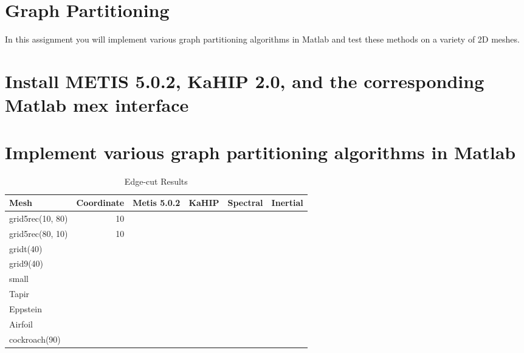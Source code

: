 \documentclass[unicode,11pt,a4paper,oneside,numbers=endperiod,openany]{scrartcl}
\begin{document}
\setassignment
{}

\newline

\section*{Graph Partitioning}
In this assignment  you will implement various graph partitioning algorithms in Matlab and test these methods on a variety of 2D meshes.



\section{Install METIS 5.0.2, KaHIP  2.0, and the corresponding Matlab mex interface }
\section{Implement various graph partitioning algorithms in Matlab }
\begin{table}[h]
	\caption{Edge-cut Results}
	\centering
	\begin{tabular}{l|r|r|r|r|r} \hline\hline 
		Mesh             &  Coordinate           & Metis 5.0.2 &  KaHIP & Spectral & Inertial  \\ \hline
		grid5rec(10, 80) &    10                   &            &            &          &           \\             
		grid5rec(80, 10) &    10                  &            &           &          &           \\ 
		gridt(40)        &                        &            &           &          &           \\ 
		grid9(40)        &                        &            &           &          &           \\ 
		small            &                        &            &           &          &           \\
		Tapir            &                        &            &           &          &           \\ 
		Eppstein         &                        &            &           &          &           \\ 
		Airfoil          &                        &            &           &          &           \\ 
		cockroach(90)    &                        &            &           &          &           \\ \hline \hline
	\end{tabular}
	\label{table:edge}
\end{table}
\end{document}
